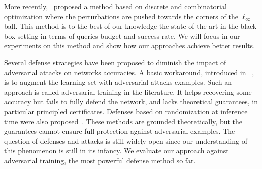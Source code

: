 More recently,~\cite{moon19aparsimonous} proposed a method based on discrete and combinatorial optimization where the perturbations are pushed towards the corners of the $\ell_\infty$ ball. This method is to the best of our knowledge the state of the art in the black box setting in terms of queries budget and success rate. We will focus in our experiments on this method and show how our approaches achieve better results. %

Several defense strategies have been proposed to diminish the impact of adversarial attacks on networks accuracies. A basic workaround, introduced in ~\citep{goodfellow2014explaining}, is to augment the learning set with adversarial attacks examples. Such an approach is called adversarial training in the literature. It helps recovering some accuracy but fails to fully defend the network, and lacks theoretical guarantees, in particular principled certificates. Defenses based on randomization at inference time were also proposed~\citep{lecuyer2018certified,KolterRandomizedSmoothing,pinot2019theoretical}. These methods are grounded theoretically, but the guarantees cannot ensure full protection against adversarial examples. The question of defenses and attacks is still widely open since our understanding of this phenomenon is still in its infancy. We evaluate our approach against adversarial training, the most powerful defense method so far.

